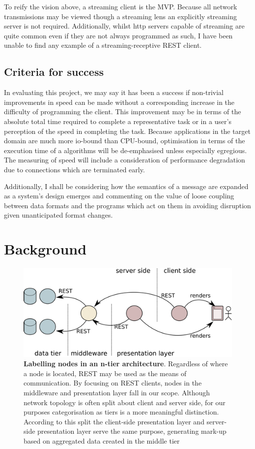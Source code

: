 \documentclass[]{article}
\makeatletter
\let\stdsection\section
\renewcommand\section{\newpage\stdsection}
\def\maxwidth{\ifdim\Gin@nat@width>\linewidth\linewidth
\else\Gin@nat@width\fi}
\let\Oldincludegraphics\includegraphics
\renewcommand{\includegraphics}[1]{\Oldincludegraphics[width=\maxwidth]{#1}}
\makeatother
\begin{document}
To reify the vision above, a streaming client is the MVP. Because all
network transmissions may be viewed though a streaming lens an
explicitly streaming server is not required. Additionally, whilst http
servers capable of streaming are quite common even if they are not
always programmed as such, I have been unable to find any example of a
streaming-receptive REST client.

\subsection{Criteria for success}

In evaluating this project, we may say it has been a success if
non-trivial improvements in speed can be made without a corresponding
increase in the difficulty of programming the client. This improvement
may be in terms of the absolute total time required to complete a
representative task or in a user's perception of the speed in completing
the task. Because applications in the target domain are much more
io-bound than CPU-bound, optimisation in terms of the execution time of
a algorithms will be de-emphasised unless especially egregious. The
measuring of speed will include a consideration of performance
degradation due to connections which are terminated early.

Additionally, I shall be considering how the semantics of a message are
expanded as a system's design emerges and commenting on the value of
loose coupling between data formats and the programs which act on them
in avoiding disruption given unanticipated format changes.

\section{Background}

\begin{figure}[htbp]
\centering
\includegraphics{images/architecture.png}
\caption{\textbf{Labelling nodes in an n-tier architecture}. Regardless
of where a node is located, REST may be used as the means of
communication. By focusing on REST clients, nodes in the middleware and
presentation layer fall in our scope. Although network topology is often
split about client and server side, for our purposes categorisation as
tiers is a more meaningful distinction. According to this split the
client-side presentation layer and server-side presentation layer serve
the same purpose, generating mark-up based on aggregated data created in
the middle tier \label{architecture}}
\end{figure}
\end{document}
